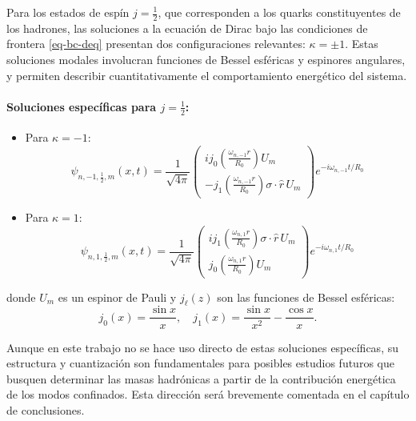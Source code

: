 \begin{remark}
    Para los estados de espín \( j = \frac{1}{2} \), que corresponden a los quarks constituyentes de los hadrones, las soluciones a la ecuación de Dirac bajo las condiciones de frontera \eqref{eq-bc-deq} presentan dos configuraciones relevantes: \( \kappa = \pm 1 \). Estas soluciones modales involucran funciones de Bessel esféricas y espinores angulares, y permiten describir cuantitativamente el comportamiento energético del sistema.

    \paragraph{Soluciones específicas para \( j = \frac{1}{2} \):}
    
    \begin{itemize}
    \item Para \( \kappa = -1 \):
    \begin{equation}
    \psi_{n, -1, \frac{1}{2}, m}(x,t) = \frac{1}{\sqrt{4\pi}} 
    \begin{pmatrix}
    i j_0\left( \frac{\omega_{n,-1} r}{R_0} \right) U_m \\
    - j_1\left( \frac{\omega_{n,-1} r}{R_0} \right) \sigma \cdot \hat{r} \, U_m
    \end{pmatrix}
    e^{-i \omega_{n,-1} t / R_0}
    \end{equation}
    
    \item Para \( \kappa = 1 \):
    \begin{equation}
    \psi_{n, 1, \frac{1}{2}, m}(x,t) = \frac{1}{\sqrt{4\pi}} 
    \begin{pmatrix}
    i j_1\left( \frac{\omega_{n,1} r}{R_0} \right) \sigma \cdot \hat{r} \, U_m \\
    j_0\left( \frac{\omega_{n,1} r}{R_0} \right) U_m
    \end{pmatrix}
    e^{-i \omega_{n,1} t / R_0}
    \end{equation}
    \end{itemize}
    
    donde \( U_m \) es un espinor de Pauli y \( j_\ell(z) \) son las funciones de Bessel esféricas:
    \[
    j_0(x) = \frac{\sin x}{x}, \quad j_1(x) = \frac{\sin x}{x^2} - \frac{\cos x}{x}.
    \]
    
    
    Aunque en este trabajo no se hace uso directo de estas soluciones específicas, su estructura y cuantización son fundamentales para posibles estudios futuros que busquen determinar las masas hadrónicas a partir de la contribución energética de los modos confinados. Esta dirección será brevemente comentada en el capítulo de conclusiones.
\end{remark}

